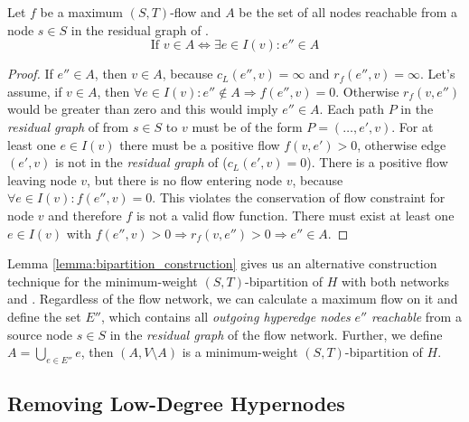 \begin{lemma}
\label{lemma:bipartition_construction}
Let $f$ be a maximum $(S,T)$-flow and $A$ be the set of all nodes reachable
from a node $s \in S$ in the residual graph of .
\[ \text{If } v \in A \Leftrightarrow \exists e \in I(v): e'' \in A \]
\end{lemma}

\begin{proof}
If $e'' \in A$, then $v \in A$, because $c_L(e'',v) = \infty$ and $r_f(e'',v) = \infty$.
Let's assume, if $v \in A$, then $\forall e \in I(v): e'' \notin A \Rightarrow f(e'',v) = 0$. 
Otherwise $r_f(v, e'')$ would be greater than zero and this would imply $e'' \in A$. Each path 
$P$ in the \emph{residual graph} of  from $s \in S$ to $v$ must be of the 
form $P = (\ldots,e',v)$. For at least one $e \in I(v)$ there must be a positive flow $f(v,e') > 0$,
otherwise edge $(e',v)$ is not in the \emph{residual graph} of  ($c_L(e',v) = 0$).
There is a positive flow leaving node $v$, but there is no flow entering node $v$, because
$\forall e \in I(v): f(e'',v) = 0$. This violates the conservation of flow
constraint for node $v$ and therefore $f$ is not a valid flow function. There must exist at least one $e \in I(v)$
with $f(e'',v) > 0 \Rightarrow r_f(v,e'') > 0 \Rightarrow e'' \in A$.
\end{proof}

Lemma \ref{lemma:bipartition_construction} gives us an alternative construction technique for the minimum-weight $(S,T)$-bipartition
of $H$ with both networks  and . Regardless of the flow network, we can 
calculate a maximum flow on it and define the set $E''$, which contains all \emph{outgoing hyperedge
nodes} $e''$ \emph{reachable} from a source node $s \in S$ in the \emph{residual graph} of the flow network. 
Further, we define $A = \bigcup_{e \in E''} e$, then $(A,V\setminus A)$ is a 
minimum-weight $(S,T)$-bipartition of $H$.


\subsection{Removing Low-Degree Hypernodes}
\label{sec:degree_network}

